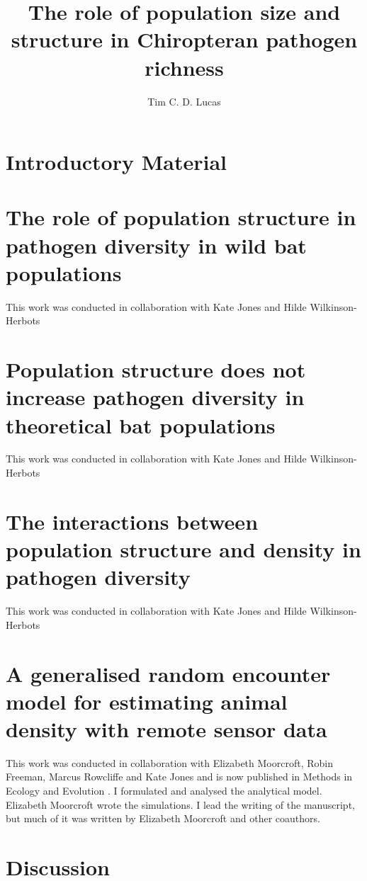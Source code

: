 \documentclass[11pt,phd,a4paper,oneside]{stanley}
\title{The role of population size and structure in Chiropteran pathogen richness}
\author{Tim C. D. Lucas}
\begin{document}



\chapter{Introductory Material}
\label{ch:intro}


\chapter{The role of population structure in pathogen diversity in wild bat populations}{This work was conducted in collaboration with Kate Jones and Hilde Wilkinson-Herbots}

\label{ch:empirical}


\chapter{Population structure does not increase pathogen diversity in theoretical bat populations}{This work was conducted in collaboration with Kate Jones and Hilde Wilkinson-Herbots}
\label{ch:sims1}


\chapter{The interactions between population structure and density in pathogen diversity}{This work was conducted in collaboration with Kate Jones and Hilde Wilkinson-Herbots}
\label{ch:sims2}



\chapter[gREM for estimating animal density]{A generalised random encounter model for estimating animal density with remote sensor data}{
This work was conducted in collaboration with Elizabeth Moorcroft, Robin Freeman, Marcus Rowcliffe and Kate Jones and is now published in Methods in Ecology and Evolution \cite{lucas2015generalised}.
I formulated and analysed the analytical model.
Elizabeth Moorcroft wrote the simulations.
I lead the writing of the manuscript, but much of it was written by Elizabeth Moorcroft and other coauthors.
}
\label{ch:grem}


\chapter{Discussion}
\label{ch:discussion}

\end{document}
